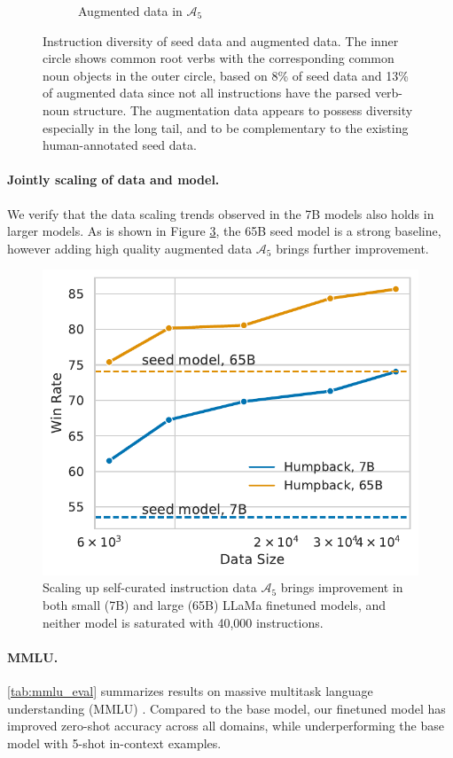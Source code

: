 \begin{figure}[t]
\begin{subfigure}[t]{0.495\textwidth}
\caption{Augmented data in $\mathcal{A}_5$}
\label{fig:a5_verb_noun}
\end{subfigure}
\caption{Instruction diversity of seed data and augmented data. The inner circle shows common root verbs with the corresponding common noun objects in the outer circle, based on 8\% of seed data and 13\% of augmented data since not all instructions have the parsed verb-noun structure. The augmentation data appears to possess diversity especially in the long tail, and to be complementary to the existing human-annotated  seed data.}
\label{fig:verb_noun_pie}
\end{figure}

\paragraph{Jointly scaling of data and model.} We verify that the data scaling trends observed in the 7B models also holds in larger models. As is shown in Figure \ref{fig:data_scaling_70b}, the 65B seed model is a strong baseline, however adding high quality augmented data $\mathcal{A}_5$ brings further improvement.  
\begin{figure}
  \centering
  \includegraphics[width=0.5\columnwidth]{figs/data_scaling_70b_mtl.pdf}
  \caption{Scaling up self-curated instruction data $\mathcal{A}_5$ brings improvement in both small (7B) and large (65B) LLaMa finetuned models, and neither model is saturated with 40,000 instructions.}
  \label{fig:data_scaling_70b}
\end{figure}



\paragraph{MMLU.} \autoref{tab:mmlu_eval} summarizes results on massive multitask language understanding (MMLU) \citep{hendrycks2020measuring}. Compared to the base model, our finetuned model has improved zero-shot accuracy across all domains, while underperforming the base model with 5-shot in-context examples.


